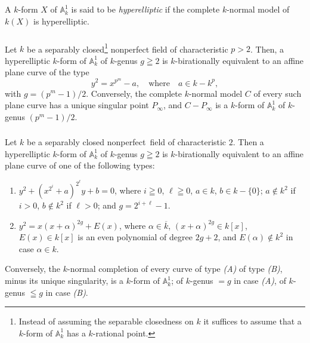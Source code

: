 \subsection{}\label{chap3:4}
A $k$-form $X$ of $\mathbb{A}^{1}_{k}$ is said to be {\em
  hyperelliptic} if the complete $k$-normal model of $k(X)$ is
hyperelliptic.

\subsubsection{}\label{chap3:1.5.1}
\begin{lemma*}[(\cf {[27; Th.\@ 2.2]}) ]
  Let $k$ be a separably closed\footnote{Instead of assuming the
    separable closedness on $k$ it suffices to assume that a $k$-form of
    $\mathbb{A}^{1}_{k}$ has a $k$-rational point.} nonperfect field of
  characteristic $p>2$. Then, a hyperelliptic $k$-form of
  $\mathbb{A}^{1}_{k}$ of $k$-genus $g\geqq 2$ is $k$-birationally
  equivalent to an affine plane curve of the type
  $$
  y^{2}=x^{p^{m}}-a,\quad\text{where}\quad a\in k-k^{p},
  $$
  with $g=(p^{m}-1)/2$. Conversely, the complete $k$-normal model $C$ of
  every such plane curve has a unique singular point $P_{\infty}$, and
  $C-P_{\infty}$ is a $k$-form of $\mathbb{A}^{1}_{k}$ of $k$-genus
  $(p^{m}-1)/2$. 
\end{lemma*}

\subsubsection{}\label{chap3:1.5.2}
\begin{lemma*}[(\cf {[ibid.; Th.\@ 2.3]}) ]
  Let $k$ be a separably closed nonperfect\pageoriginale\ field of
  characteristic $2$. Then a hyperelliptic $k$-form of
  $\mathbb{A}^{1}_{k}$ of $k$-genus $g\geqq 2$ is $k$-birationally
  equivalent to an affine plane curve of one of the following types:
  \begin{enumerate}
    \renewcommand{\theenumi}{\Alph{enumi}}
    \renewcommand{\labelenumi}{\rm(\theenumi)}
  \item $y^{2}+(x^{2^{i}}+a)^{2^{\ell}}y+b=0$, where $i\geqq 0$,
    $\ell\geqq 0$, $a\in k$, $b\in k-\{0\}$; $a\not\in k^{2}$ if $i>0$,
    $b\not\in k^{2}$ if $\ell>0$; and $g=2^{i+\ell}-1$.
    
  \item $y^{2}=x(x+\alpha)^{2g}+E(x)$, where $\alpha\in\overline{k}$,
    $(x+\alpha)^{2g}\in k[x]$, $E(x)\in k[x]$ is an even polynomial of
    degree $2g+2$, and $E(\alpha)\not\in k^{2}$ in case $\alpha\in k$.
  \end{enumerate}
  Conversely, the $k$-normal completion of every curve of type {\em(A)}
  of type {\em(B)}, minus its unique singularity, is a $k$-form of
  $\mathbb{A}^{1}_{k}$; of $k$-genus $=g$ in case {\em(A)}, of $k$-genus
  $\leqq g$ in case {\em(B)}. 
\end{lemma*}


